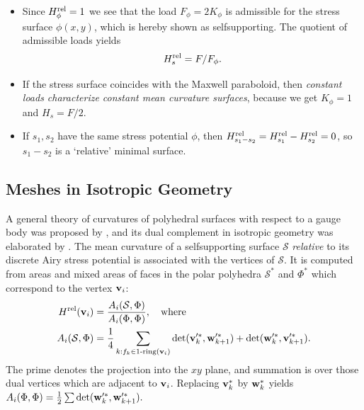 \documentclass[annual]{acmsiggraph}
\def\rel{{\mathord{\text{\rm rel}}}}
\def\SS{{\mathcal S}}
\begin{document}
\begin{itemize}\itemsep-\parsep

\item Since $H^\rel_\phi=1$ we see that the load $F_\phi=2K_\phi$ is 
admissible for the stress surface $\phi(x,y)$, which is hereby shown as 
self\dash supporting. The quotient of admissible loads yields
	\begin{equation}
	 H_s^\rel = F/F_\phi. \label{equigeo2}
	\end{equation}

\item If the stress surface coincides with the Maxwell paraboloid, then 
{\em constant loads characterize constant mean curvature surfaces}, 
because we get $K_\phi=1$ and $H_s=F/2$.

\item If $s_1,s_2$ have the same stress potential $\phi$, then 
$H^\rel_{s_1-s_2}=H^\rel_{s_1}-H^\rel_{s_2}=0$, so $s_1-s_2$ is a 
`relative' minimal surface.

\end{itemize}



\subsection{Meshes in Isotropic Geometry} \label{sec:discrete}

A general theory of curvatures of polyhedral surfaces with respect to a 
gauge body was proposed by \cite{Pottmann2007b}, and its dual complement 
in isotropic geometry was elaborated by \cite{Pottmann2007}. The mean 
curvature of a self\dash supporting surface $\SS$ {\em relative} to its 
discrete Airy stress potential is associated with the vertices of $\SS$. 
It is computed from areas and mixed areas of faces in the polar polyhedra 
$\SS^*$ and $\Phi^*$ which correspond to the vertex ${\mathbf v}_i$:
	\begin{align*}
	H^\rel(\vw_i)
	&= {A_i(\SS,\Phi) \over A_i(\Phi,\Phi)}, 
	\quad\text{where}
	\\
		A_i (\SS,\Phi) 
	&= 
	\frac{1}{4}
		\sum_{k:f_k\in \text{1-ring}(\vw_i)}
		\det(\vw'^*_k, \ww'^*_{k+1}) 
		+ \det(\ww'^*_k, \vw'^*_{k+1}).
	\end{align*}
 The prime denotes the projection into the $xy$ plane, and summation is 
over those dual vertices which are adjacent to ${\mathbf v}_i$. 
Replacing ${\mathbf v}_k^*$ by ${\mathbf w}_k^*$ yields
	$
		A_i (\Phi,\Phi) 
	= 
	\frac{1}{2}
		\sum
		\det({\mathbf w}'^*_k, {\mathbf w}'^*_{k+1}).
	$
\end{document}
